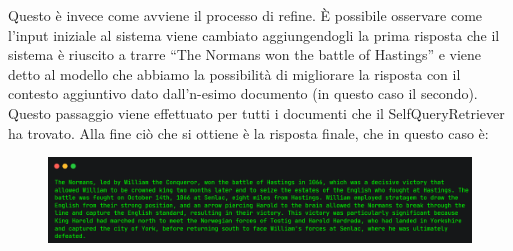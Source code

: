 Questo è invece come avviene il processo di refine.
È possibile osservare come l'input iniziale al sistema viene cambiato aggiungendogli la prima risposta che il sistema è riuscito a trarre ``The Normans won the battle of Hastings'' e viene detto al modello che abbiamo la possibilità di migliorare la risposta con il contesto aggiuntivo dato dall'n-esimo documento (in questo caso il secondo). Questo passaggio viene effettuato per tutti i documenti che il SelfQueryRetriever ha trovato.
\newpage
Alla fine ciò che si ottiene è la risposta finale, che in questo caso è:

\begin{figure}[H]
    \includegraphics[width=0.7\pdfpagewidth]{images/refine_step_3.png}
\end{figure}

